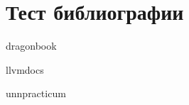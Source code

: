 \newpage
\section*{Тест библиографии}

dragonbook ~\cite{dragon_book}

llvmdocs ~\cite{llvm_docs}

unnpracticum ~\cite{unn_practicum}
